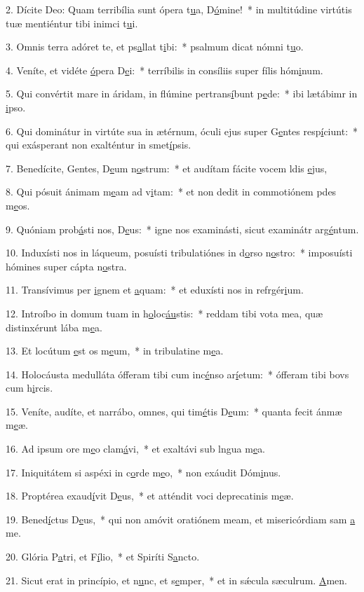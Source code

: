 2. Dícite Deo: Quam terribília sunt ópera t\uline{u}a, D\uline{ó}mine!~* in multitúdine virtútis tuæ mentiéntur tibi inimci t\uline{u}i.\par 
3. Omnis terra adóret te, et ps\uline{a}llat t\uline{i}bi:~* psalmum dicat nómni t\uline{u}o.\par 
4. Veníte, et vidéte \uline{ó}pera D\uline{e}i:~* terríbilis in consíliis super fílis hóm\uline{i}num.\par 
5. Qui convértit mare in áridam, in flúmine pertrans\uline{í}bunt p\uline{e}de:~* ibi lætábimr in \uline{i}pso.\par 
6. Qui dominátur in virtúte sua in ætérnum, óculi ejus super G\uline{e}ntes resp\uline{í}ciunt:~* qui exásperant non exalténtur in smet\uline{í}psis.\par 
7. Benedícite, Gentes, D\uline{e}um n\uline{o}strum:~* et audítam fácite vocem ldis \uline{e}jus,\par 
8. Qui pósuit ánimam m\uline{e}am ad v\uline{i}tam:~* et non dedit in commotiónem pdes m\uline{e}os.\par 
9. Quóniam prob\uline{á}sti nos, D\uline{e}us:~* igne nos examinásti, sicut examinátr arg\uline{é}ntum.\par 
10. Induxísti nos in láqueum, posuísti tribulatiónes in d\uline{o}rso n\uline{o}stro:~* imposuísti hómines super cápta n\uline{o}stra.\par 
11. Transívimus per \uline{i}gnem et \uline{a}quam:~* et eduxísti nos in refrgér\uline{i}um.\par 
12. Introíbo in domum tuam in h\uline{o}loc\uline{áu}stis:~* reddam tibi vota mea, quæ distinxérunt lába m\uline{e}a.\par 
13. Et locútum \uline{e}st os m\uline{e}um,~* in tribulatine m\uline{e}a.\par 
14. Holocáusta medulláta ófferam tibi cum inc\uline{é}nso ar\uline{í}etum:~* ófferam tibi bovs cum h\uline{i}rcis.\par 
15. Veníte, audíte, et narrábo, omnes, qui tim\uline{é}tis D\uline{e}um:~* quanta fecit ánmæ m\uline{e}æ.\par 
16. Ad ipsum ore m\uline{e}o clam\uline{á}vi,~* et exaltávi sub lngua m\uline{e}a.\par 
17. Iniquitátem si aspéxi in c\uline{o}rde m\uline{e}o,~* non exáudit Dóm\uline{i}nus.\par 
18. Proptérea exaud\uline{í}vit D\uline{e}us,~* et atténdit voci deprecatinis m\uline{e}æ.\par 
19. Bened\uline{í}ctus D\uline{e}us,~* qui non amóvit oratiónem meam, et misericórdiam sam \uline{a} me.\par 
20. Glória P\uline{a}tri, et F\uline{í}lio,~* et Spiríti S\uline{a}ncto.\par 
21. Sicut erat in princípio, et n\uline{u}nc, et s\uline{e}mper,~* et in sǽcula sæculrum. \uline{A}men.\par 
